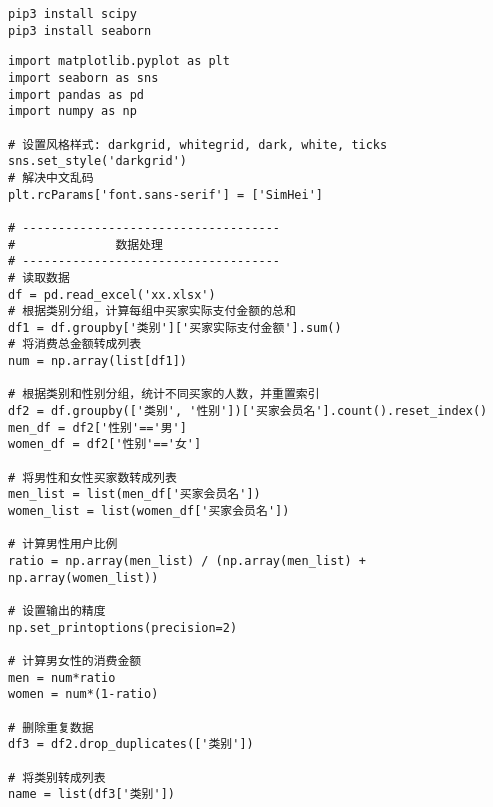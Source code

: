 \documentclass[a4paper]{ctexart}    %
\begin{document}
\begin{tcolorbox}[
         colback=red!5!white,
         colframe=teal,
         title=\textbf{Install Seaborn}
    ]
\begin{verbatim}
pip3 install scipy
pip3 install seaborn
\end{verbatim}
\end{tcolorbox}

\newpage
\begin{tcolorbox}[
         colback=red!5!white,
         colframe=teal,
         title=\textbf{seaborn (堆叠)柱状图1/2}
    ]
\begin{verbatim}
import matplotlib.pyplot as plt
import seaborn as sns
import pandas as pd
import numpy as np

# 设置风格样式: darkgrid, whitegrid, dark, white, ticks
sns.set_style('darkgrid')
# 解决中文乱码
plt.rcParams['font.sans-serif'] = ['SimHei']

# ------------------------------------
#              数据处理
# ------------------------------------
# 读取数据
df = pd.read_excel('xx.xlsx')
# 根据类别分组，计算每组中买家实际支付金额的总和
df1 = df.groupby['类别']['买家实际支付金额'].sum()
# 将消费总金额转成列表
num = np.array(list[df1])

# 根据类别和性别分组，统计不同买家的人数，并重置索引
df2 = df.groupby(['类别', '性别'])['买家会员名'].count().reset_index()
men_df = df2['性别'=='男']
women_df = df2['性别'=='女']

# 将男性和女性买家数转成列表
men_list = list(men_df['买家会员名'])
women_list = list(women_df['买家会员名'])

# 计算男性用户比例
ratio = np.array(men_list) / (np.array(men_list) + np.array(women_list))

# 设置输出的精度
np.set_printoptions(precision=2)

# 计算男女性的消费金额
men = num*ratio
women = num*(1-ratio)

# 删除重复数据
df3 = df2.drop_duplicates(['类别'])

# 将类别转成列表
name = list(df3['类别'])
\end{verbatim}
\end{tcolorbox}
\end{document}
